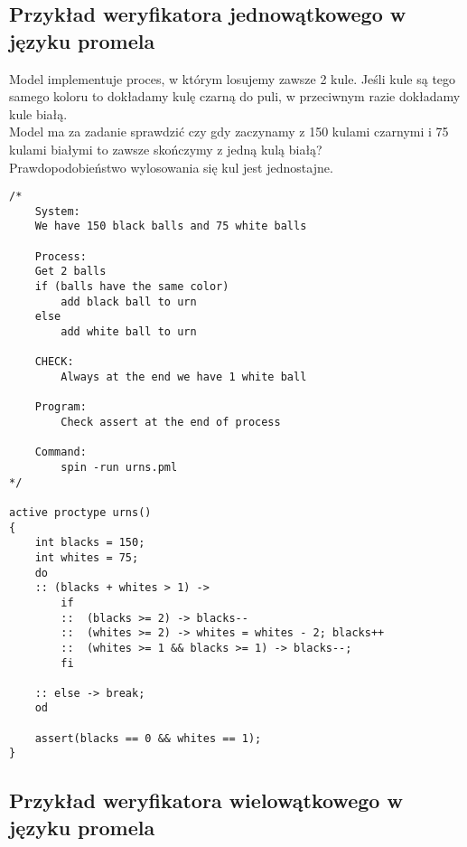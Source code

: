 \subsection{Przykład weryfikatora jednowątkowego w języku promela} \label{dodatek:promelaST}
Model implementuje proces, w którym losujemy zawsze 2 kule. Jeśli kule są tego samego koloru to dokładamy kulę czarną do puli, w przeciwnym razie dokładamy kule białą. \\
Model ma za zadanie sprawdzić czy gdy zaczynamy z 150 kulami czarnymi i 75 kulami białymi to zawsze skończymy z jedną kulą białą? \\
Prawdopodobieństwo wylosowania się kul jest jednostajne.
\begin{lstlisting}[language=Promela,style=myPromela]
/*
    System:
    We have 150 black balls and 75 white balls

    Process:
    Get 2 balls
    if (balls have the same color)
        add black ball to urn
    else
        add white ball to urn

    CHECK:
        Always at the end we have 1 white ball

    Program:
        Check assert at the end of process

    Command:
        spin -run urns.pml
*/

active proctype urns()
{
    int blacks = 150;
    int whites = 75;
    do
    :: (blacks + whites > 1) ->
        if
        ::	(blacks >= 2) -> blacks--
        ::	(whites >= 2) -> whites = whites - 2; blacks++
        ::	(whites >= 1 && blacks >= 1) -> blacks--;
        fi

    :: else -> break;
    od

    assert(blacks == 0 && whites == 1);
}
\end{lstlisting}

\clearpage

\subsection{Przykład weryfikatora wielowątkowego w języku promela} \label{dodatek:promelaMT}

